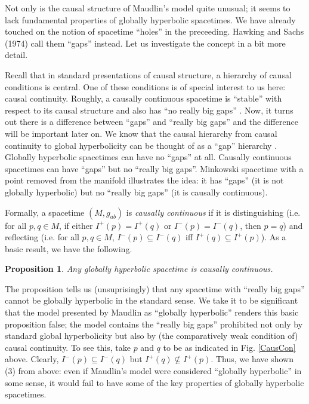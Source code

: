\documentclass[authoryear,12pt,3p]{jowarticle}
\newtheorem{prop}[thm]{Proposition}
\begin{document}
Not only is the causal structure of Maudlin's model quite unusual; it seems to lack fundamental properties of globally hyperbolic spacetimes. We have already touched on the notion of spacetime ``holes'' in the preceeding. Hawking and Sachs (1974) call them ``gaps'' instead. Let us investigate the concept in a bit more detail.

Recall that in standard presentations of causal structure, a hierarchy of causal conditions is central. One of these conditions is of special interest to us here: causal continuity. Roughly, a causally continuous spacetime is ``stable'' with respect to its causal structure and also has ``no really big gaps'' \citep[p. 288]{Hawking+Sachs}. Now, it turns out there is a difference between ``gaps'' and ``really big gaps'' and the difference will be important later on. We know that the causal hierarchy from causal continuity to global hyperbolicity can be thought of as a ``gap'' hierarchy \citep[p. 295]{Hawking+Sachs}. Globally hyperbolic spacetimes can have no ``gaps'' at all. Causally continuous spacetimes can have ``gaps'' but no ``really big gaps''. Minkowski spacetime with a point removed from the manifold illustrates the idea: it has ``gaps'' (it is not globally hyperbolic) but no ``really big gaps'' (it is causally continuous).

Formally, a spacetime $(M, g_{ab})$ is {\em causally continuous} if it is distinguishing (i.e. for all $p, q \in M$, if either $I^+(p)=I^+(q)$ or $I^-(p)=I^-(q)$, then $p=q$) and reflecting (i.e. for all $p, q \in M$, $I^-(p) \subseteq I^-(q)$ iff $I^+(q) \subseteq I^+(p)$). As a basic result, we have the following. \\

\begin{prop} Any globally hyperbolic spacetime is causally continuous. \end{prop}

The proposition tells us (unsuprisingly) that any spacetime with ``really big gaps'' cannot be globally hyperbolic in the standard sense. We take it to be significant that the model presented by Maudlin as ``globally hyperbolic'' renders this basic proposition false; the model contains the ``really big gaps'' prohibited not only by standard global hyperbolicity but also by (the comparatively weak condition of) causal continuity. To see this, take $p$ and $q$ to be as indicated in Fig. \ref{CausCon} above. Clearly, $I^-(p) \subseteq I^-(q)$ but $I^+(q) \nsubseteq I^+(p)$. Thus, we have shown (3) from above: even if Maudlin's model were considered ``globally hyperbolic'' in some sense, it would fail to have some of the key properties of globally hyperbolic spacetimes.
\end{document}
